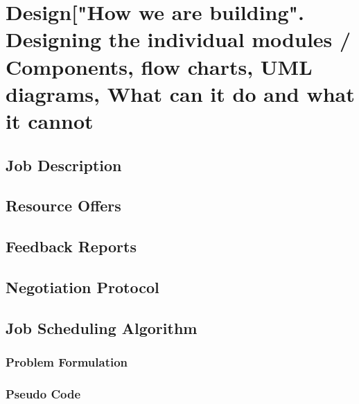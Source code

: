 \chapter{Design["How we are building". Designing the individual modules / Components, flow charts, UML diagrams, What can it do and what it cannot}\label{chapter:ischeduler}
\section{Job Description}
\section{Resource Offers}
\section{Feedback Reports}
\section{Negotiation Protocol}
\section{Job Scheduling Algorithm}
\subsection{Problem Formulation}
\subsection{Pseudo Code}
